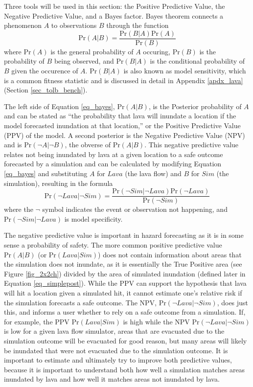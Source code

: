 	Three tools will be used in this section: the Positive Predictive Value, the Negative Predictive Value, and a Bayes factor. Bayes theorem connects a phenomenon $A$ to observations $B$ through the function
	\begin{equation}
		\text{Pr}(A|B)=\frac{\text{Pr}(B|A)\text{Pr}(A)}{\text{Pr}(B)}\label{eq_bayes}
	\end{equation}
	where $\text{Pr}(A)$ is the general probability of $A$ occuring, $\text{Pr}(B)$ is the probability of $B$ being observed, and $\text{Pr}(B|A)$ is the conditional probability of $B$ given the occurence of $A$. $\text{Pr}(B|A)$ is also known as model sensitivity, which is a common fitness statistic and is discussed in detail in Appendix \ref{apdx_lava} (Section \ref{sec_tolb_bench}).
	
	The left side of Equation \ref{eq_bayes}, $\text{Pr}(A|B)$, is the Posterior probability of $A$ and can be stated as ``the probability that lava will inundate a location if the model forecasted inundation at that location,'' or the Positive Predictive Value (PPV) of the model. A second posterior is the Negative Predictive Value (NPV) and is $\text{Pr}(\neg A|\neg B)$, the obverse of $\text{Pr}(A|B)$. This negative predictive value relates not being inundated by lava at a given location to a safe outcome forecasted by a simulation and can be calculated by modifying Equation \ref{eq_bayes} and substituting $A$ for $Lava$ (the lava flow) and $B$ for $Sim$ (the simulation), resulting in the formula
	\begin{equation}
		\text{Pr}(\neg Lava|\neg Sim)=\frac{\text{Pr}(\neg Sim|\neg Lava)\text{Pr}(\neg Lava)}{\text{Pr}(\neg Sim)}
	\end{equation}
	where the $\neg$ symbol indicates the event or observation not happening, and $\text{Pr}(\neg Sim|\neg Lava)$ is model specificity.
	
	The negative predictive value is important in hazard forecasting as it is in some sense a probability of safety. The more common positive predictive value $\text{Pr}(A|B)$ (or $\text{Pr}(Lava|Sim)$) does not contain information about areas that the simulation does not inundate, as it is essentially the True Positive area (see Figure \ref{fig_2x2ch}) divided by the area of simulated inundation (defined later in Equation \ref{eq_simplepost}). While the PPV can support the hypothesis that lava will hit a location given a simulated hit, it cannot estimate one's relative risk if the simulation forecasts a safe outcome. The NPV, $\text{Pr}(\neg Lava|\neg Sim)$, does just this, and informs a user whether to rely on a safe outcome from a simulation. If, for example, the PPV $\text{Pr}(Lava|Sim)$ is high while the NPV $\text{Pr}(\neg Lava|\neg Sim)$ is low for a given lava flow simulator, areas that are evacuated due to the simulation outcome will be evacuated for good reason, but many areas will likely be inundated that were not evacuated due to the simulation outcome. It is important to estimate and ultimately try to improve both predictive values, because it is important to understand both how well a simulation matches areas inundated by lava and how well it matches areas not inundated by lava.
	
